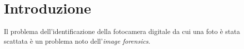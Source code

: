 \section{Introduzione}

Il problema dell'identificazione della fotocamera digitale da cui una foto è stata scattata è un problema noto dell'\emph{image forensics}. 